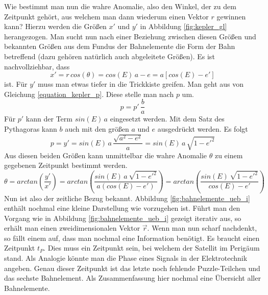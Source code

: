 \newpar
Wie bestimmt man nun die wahre Anomalie, also den Winkel, der zu dem Zeitpunkt gehört, aus welchem man dann wiederum einen Vektor \ensuremath{r} gewinnen kann? Hierzu werden die Größen \ensuremath{x'} und \ensuremath{y'} in Abbildung \ref{fig:kepler_gl} herangezogen. Man sucht nun nach einer Beziehung zwischen diesen Größen und bekannten Größen aus dem Fundus der Bahnelemente die Form der Bahn betreffend (dazu gehören natürlich auch abgeleitete Größen). 
Es ist nachvollziehbar, dass 
\begin{equation}
	x'=r\,cos(\theta)=cos(E)\,a-e=a\left[cos(E)-e'\right]
\end{equation}
ist. Für \ensuremath{y'} muss man etwas tiefer in die Trickkiste greifen. Man geht aus von Gleichung \ref{equation_kepler_p}. Diese stelle man nach \ensuremath{p} um.
\begin{equation}
	p=p'\,\frac{b}{a}
\end{equation} 
Für \ensuremath{p'} kann der Term \ensuremath{sin(E)\,a} eingesetzt werden. Mit dem Satz des Pythagoras kann \ensuremath{b} auch mit den größen \ensuremath{a} und \ensuremath{e} ausgedrückt werden. Es folgt  
\begin{equation}
	p=y'=sin(E)\,a\,\frac{\sqrt{a^2-e^2}}{a}=sin(E)\,a\,\sqrt{1-e'^2}
\end{equation} 
Aus diesen beiden Größen kann unmittelbar die wahre Anomalie \ensuremath{\theta} zu einem gegebenen Zeitpunkt bestimmt werden.
\begin{equation}
	\theta=arctan\left(\frac{y'}{x'}\right)=arctan\left(\frac{sin(E)\,a\,\sqrt{1-e'^2}}{a\left(cos(E)-e'\right)}\right)=arctan\left(\frac{sin(E)\,\sqrt{1-e'^2}}{cos(E)-e'}\right)
\end{equation}
\newpar
Nun ist also der zeitliche Bezug bekannt. Abbildung \ref{fig:bahnelemente_ueb_i} enthält nochmal eine kleine Darstellung wie vorzugehen ist.
Führt man den Vorgang wie in Abbildung \ref{fig:bahnelemente_ueb_i} gezeigt iterativ aus, so erhält man einen zweidimensionalen Vektor \ensuremath{\vec{r}}. Wenn man nun scharf nachdenkt, so fällt einem auf, dass man nochmal eine Information benötigt. Es braucht einen Zeitpunkt \ensuremath{t_P}. Dies muss ein Zeitpunkt sein, bei welchem der Satellit im Perigäum stand. Als Analogie könnte man die Phase eines Signals in der Elektrotechnik angeben. Genau dieser Zeitpunkt ist das letzte noch fehlende Puzzle-Teilchen und das sechste Bahnelement.
\newpar
Als Zusammenfassung hier nochmal eine Übersicht aller Bahnelemente. 
